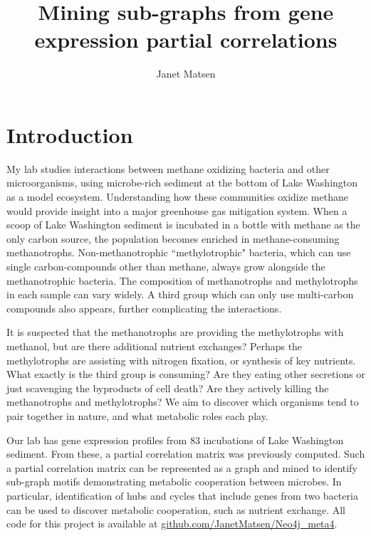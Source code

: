 \documentclass[12pt]{article}
\begin{document}
 
\title{Mining sub-graphs from gene expression partial correlations}
\author{Janet Matsen}
\maketitle

\section{Introduction} %

My lab studies interactions between methane oxidizing bacteria and other microorganisms, using microbe-rich sediment at the bottom of Lake Washington as a model ecosystem. 
Understanding how these communities oxidize methane would provide insight into a major greenhouse gas mitigation system. 
When a scoop of Lake Washington sediment is incubated in a bottle with methane as the only carbon source, the population becomes enriched in methane-consuming methanotrophs.
Non-methanotrophic ``methylotrophic" bacteria, which can use single carbon-compounds other than methane, always grow alongside the methanotrophic bacteria.
The composition of methanotrophs and methylotrophs in each sample can vary widely.
A third group which can only use multi-carbon compounds also appears, further complicating the interactions.

It is suspected that the methanotrophs are providing the methylotrophs with methanol, but are there additional nutrient exchanges?
Perhaps the methylotrophs are assisting with nitrogen fixation, or synthesis of key nutrients. 
What exactly is the third group is consuming?  
Are they eating other secretions or just scavenging the byproducts of cell death?
Are they actively killing the methanotrophs and methylotrophs?
We aim to discover which organisms tend to pair together in nature, and what metabolic roles each play. 

Our lab has gene expression profiles from 83 incubations of Lake Washington sediment. 
From these, a partial correlation matrix was previously computed. 
Such a partial correlation matrix can be represented as a graph and mined to identify sub-graph motifs demonstrating metabolic cooperation between microbes. 
In particular, identification of hubs and cycles that include genes from two bacteria can be used to discover metabolic cooperation, such as nutrient exchange. 
All code for this project is available at \href{https://github.com/JanetMatsen/Neo4j_meta4}{github.com/JanetMatsen/Neo4j\_meta4}.
\end{document}
